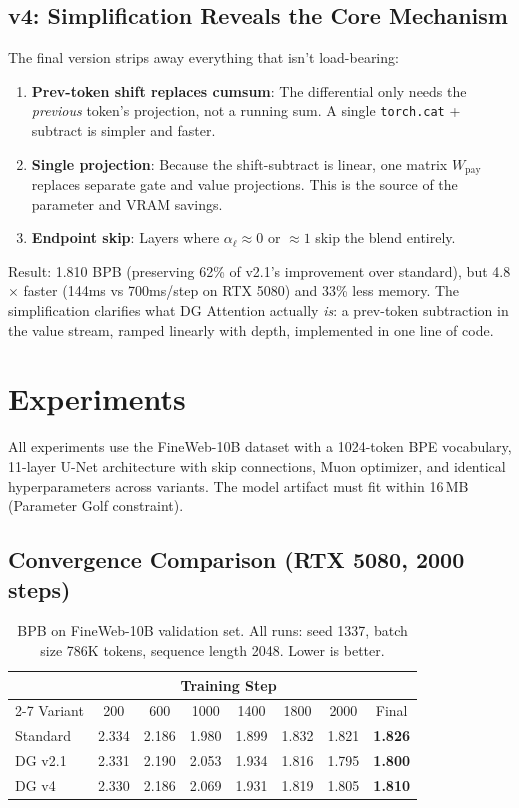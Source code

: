 \documentclass[11pt]{article}
\begin{document}
\subsection{v4: Simplification Reveals the Core Mechanism}
\label{sec:v4}
The final version strips away everything that isn't load-bearing:
\begin{enumerate}
    \item \textbf{Prev-token shift replaces cumsum}: The differential only needs the \emph{previous} token's projection, not a running sum. A single \texttt{torch.cat} + subtract is simpler and faster.
    \item \textbf{Single projection}: Because the shift-subtract is linear, one matrix $W_{\text{pay}}$ replaces separate gate and value projections. This is the source of the parameter and VRAM savings.
    \item \textbf{Endpoint skip}: Layers where $\alpha_\ell \approx 0$ or $\approx 1$ skip the blend entirely.
\end{enumerate}
Result: 1.810 BPB (preserving 62\% of v2.1's improvement over standard), but 4.8$\times$ faster (144ms vs 700ms/step on RTX 5080) and 33\% less memory. The simplification clarifies what DG Attention actually \emph{is}: a prev-token subtraction in the value stream, ramped linearly with depth, implemented in one line of code.

\section{Experiments}
\label{sec:experiments}

All experiments use the FineWeb-10B dataset \citep{penedo2024fineweb} with a 1024-token BPE vocabulary, 11-layer U-Net architecture with skip connections, Muon optimizer, and identical hyperparameters across variants. The model artifact must fit within 16\,MB (Parameter Golf constraint).

\subsection{Convergence Comparison (RTX 5080, 2000 steps)}

\begin{table}[h]
\centering
\caption{BPB on FineWeb-10B validation set. All runs: seed 1337, batch size 786K tokens, sequence length 2048. Lower is better.}
\label{tab:convergence}
\begin{tabular}{@{}lccccccc@{}}
\toprule
& \multicolumn{6}{c}{Training Step} & \\
\cmidrule(lr){2-7}
Variant & 200 & 600 & 1000 & 1400 & 1800 & 2000 & Final \\
\midrule
Standard       & 2.334 & 2.186 & 1.980 & 1.899 & 1.832 & 1.821 & \textbf{1.826} \\
DG v2.1        & 2.331 & 2.190 & 2.053 & 1.934 & 1.816 & 1.795 & \textbf{1.800} \\
DG v4          & 2.330 & 2.186 & 2.069 & 1.931 & 1.819 & 1.805 & \textbf{1.810} \\
\bottomrule
\end{tabular}
\end{table}
\end{document}
